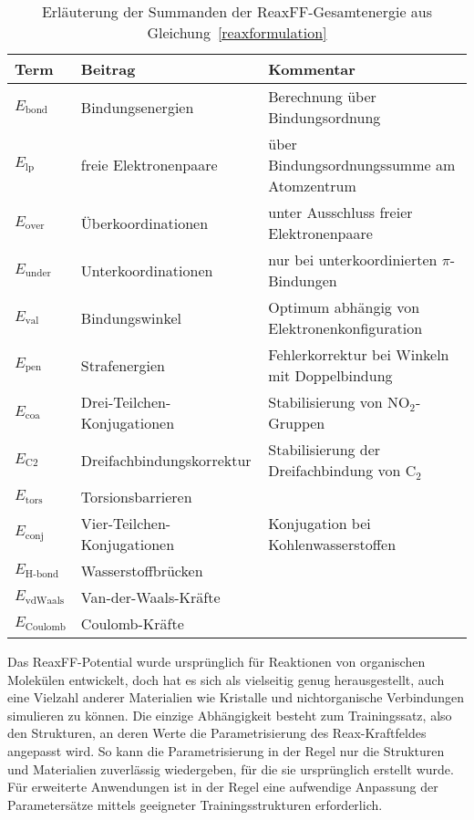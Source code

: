 \begin{table}[!b]
  \oddrowcolors
  \caption[Summanden der ReaxFF-Gesamtenergie]{
    Erläuterung der Summanden der ReaxFF-Gesamtenergie aus Gleichung~\ref{reaxformulation}\cite{van_duin_reaxff:_2001}
  }
  \label{tab:reaxenergies}
  \begin{tabularx}{\textwidth}{|llX|}
    \hline
    \textbf{Term}      & \textbf{Beitrag}            & \textbf{Kommentar}                            \\
    \hline
    $E_\text{bond}$    & Bindungsenergien            & Berechnung über Bindungsordnung               \\
    $E_\text{lp}$      & freie Elektronenpaare       & über Bindungsordnungssumme am Atomzentrum     \\
    $E_\text{over}$    & Überkoordinationen          & unter Ausschluss freier Elektronenpaare       \\
    $E_\text{under}$   & Unterkoordinationen         & nur bei unterkoordinierten $\pi$-Bindungen    \\
    $E_\text{val}$     & Bindungswinkel              & Optimum abhängig von Elektronenkonfiguration  \\
    $E_\text{pen}$     & Strafenergien               & Fehlerkorrektur bei Winkeln mit Doppelbindung \\
    $E_\text{coa}$     & Drei-Teilchen-Konjugationen & Stabilisierung von NO$_2$-Gruppen             \\
    $E_\text{C2}$      & Dreifachbindungskorrektur   & Stabilisierung der Dreifachbindung von C$_2$  \\
    $E_\text{tors}$    & Torsionsbarrieren           &                                               \\
    $E_\text{conj}$    & Vier-Teilchen-Konjugationen & Konjugation bei Kohlenwasserstoffen           \\
    $E_\text{H-bond}$  & Wasserstoffbrücken          &                                               \\
    $E_\text{vdWaals}$ & Van-der-Waals-Kräfte        &                                               \\
    $E_\text{Coulomb}$ & Coulomb-Kräfte              &                                               \\
    \hline
  \end{tabularx}
\end{table}

Das ReaxFF-Potential wurde ursprünglich für Reaktionen von organischen Molekülen entwickelt\cite{van_duin_reaxff:_2001}, doch hat es sich als vielseitig genug herausgestellt, auch eine Vielzahl anderer Materialien wie Kristalle und nichtorganische Verbindungen simulieren zu können\cite{kulkarni_oxygen_2013,narayanan_reactive_2012,zhang_carbon_2009}.
Die einzige Abhängigkeit besteht zum Trainingssatz, also den Strukturen, an deren Werte die Parametrisierung des Reax-Kraftfeldes angepasst wird.
So kann die Parametrisierung in der Regel nur die Strukturen und Materialien zuverlässig wiedergeben, für die sie ursprünglich erstellt wurde.
Für erweiterte Anwendungen ist in der Regel eine aufwendige Anpassung der Parametersätze mittels geeigneter Trainingsstrukturen erforderlich.

